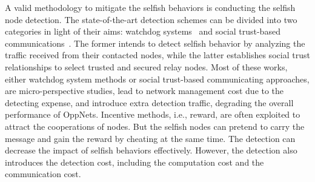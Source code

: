 %
A valid methodology to mitigate the selfish behaviors
is conducting the selfish node detection.
The state-of-the-art detection schemes
can be divided into two categories
in light of their aims:
watchdog systems~\cite{DBLP:conf/mobicom/MartiGLB00,
DBLP:journals/tmc/Hernandez-Orallo15,
DBLP:journals/tie/DiasRXM15,
DBLP:journals/fgcs/JedariXCDTA19}
and social trust-based communications~\cite{DBLP:journals/tpds/ZhuDGDC14,
DBLP:journals/tdsc/ChoC18,
DBLP:conf/sigcomm/SouzaMSMCC16,
DBLP:journals/tmc/ChoiSLW12}.
The former intends to detect selfish behavior
by analyzing the traffic received
from their contacted nodes,
while the latter establishes social trust relationships
to select trusted and secured relay nodes.
Most of these works,
either watchdog system methods
or social trust-based communicating approaches,
are micro-perspective studies,
lead to network management cost
due to the detecting expense,
and introduce extra detection traffic,
degrading the overall performance of OppNets.
Incentive methods, i.e., reward,
are often exploited to attract the cooperations of nodes.
But the selfish nodes can pretend to carry the message
and gain the reward by cheating at the same time.
The detection can decrease the impact of selfish behaviors effectively.
However, the detection also introduces the detection cost,
including the computation cost and the communication cost.

